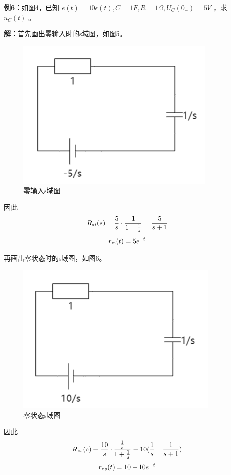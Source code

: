\documentclass[UTF8,a4paper,11pt]{article}
\begin{document}
\textbf{例6：}如图4，已知 $e(t)=10\epsilon(t), C=1F, R=1\Omega, U_C(0_-)=5V$ ，求 $u_C(t)$ 。

\textbf{解：}首先画出零输入时的s域图，如图5。
\begin{figure}[htbp]
\centering
\includegraphics{p5.png}
\caption{零输入s域图}
\end{figure}

因此
\begin{equation}
R_{zi}(s)=\frac{5}{s}\cdot\frac{1}{1+\frac{1}{s}}=\frac{5}{s+1}
\notag
\end{equation}
\begin{equation}
r_{zi}(t)=5e^{-t}
\notag
\end{equation}

再画出零状态时的s域图，如图6。
\begin{figure}[htbp]
\centering
\includegraphics{p6.png}
\caption{零状态s域图}
\end{figure}

因此
\begin{equation}
R_{zs}(s)=\frac{10}{s}\cdot\frac{\frac{1}{s}}{1+\frac{1}{s}}=10(\frac{1}{s}-\frac{1}{s+1})
\notag
\end{equation}
\begin{equation}
r_{zs}(t)=10-10e^{-t}
\notag
\end{equation}
\end{document}

